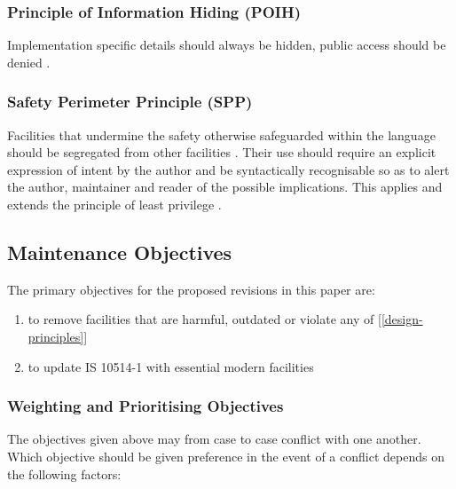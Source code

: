 \documentclass[10pt,a4paper,leqno,fleqn]{article}
\begin{document}
\subsubsection{Principle of Information Hiding (POIH)}
\label{POIH}

Implementation specific details should always be hidden, public access should
be denied \cite{Parnas72}.

\subsubsection{Safety Perimeter Principle (SPP)}
\label{SPP}

Facilities that undermine the safety otherwise safeguarded within the language
should be segregated from other facilities \cite[ch.29]{Wirth88}. Their
use should require an explicit expression of intent by the author and be
syntactically recognisable so as to alert the author, maintainer and reader
of the possible implications. This applies and extends the principle of least
privilege \cite{Saltzer74}.


\subsection{Maintenance Objectives}

The primary objectives for the proposed revisions in this paper are:

\renewcommand{\labelenumi}{(\arabic{enumi})}
\begin{enumerate}[leftmargin=!, labelindent=-0.75em, itemindent=0em]
\item to remove facilities that are harmful, outdated or violate
any of [\ref{design-principles}]
\item to update IS 10514-1 with essential modern facilities
\end{enumerate}

\subsubsection{Weighting and Prioritising Objectives}

\noindent The objectives given above may from case to case conflict with one
another. Which objective should be given preference in the event of a conflict
depends on the following factors:
\end{document}
